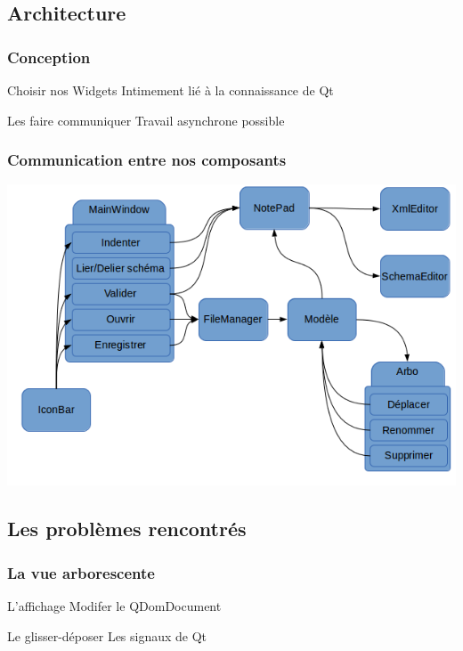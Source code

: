 \documentclass{beamer}
\begin{document}
        \subsection{Architecture}
        \begin{frame}
          \frametitle{Conception}
          \begin{block}{Choisir nos Widgets}
            Intimement lié à la connaissance de Qt
          \end{block}
          \pause
          \begin{block}{Les faire communiquer}
            Travail asynchrone possible
          \end{block}
        \end{frame}
        
        \begin{frame}
          \frametitle{Communication entre nos composants}
          \includegraphics[scale=0.5]{images/communication.png}
        \end{frame}

        \subsection{Les problèmes rencontrés}

        \begin{frame}
          \frametitle{La vue arborescente}
          \begin{block}{L'affichage}
            Modifer le QDomDocument
          \end{block}
          \pause
          \begin{block}{Le glisser-déposer}
            Les signaux de Qt
          \end{block}
        \end{frame}
\end{document}
